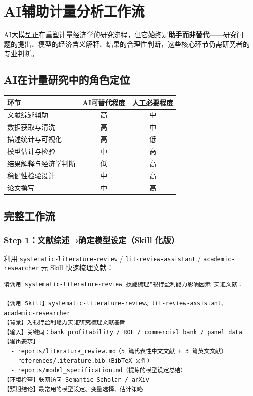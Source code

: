 \section{AI辅助计量分析工作流}

AI大模型正在重塑计量经济学的研究流程，但它始终是\textbf{助手而非替代}——研究问题的提出、模型的经济含义解释、结果的合理性判断，这些核心环节仍需研究者的专业判断。

\subsection{AI在计量研究中的角色定位}

\begin{table}[H]
\centering
\begin{tabular}{lcc}
\toprule
\textbf{环节} & \textbf{AI可替代程度} & \textbf{人工必要程度} \\
\midrule
文献综述辅助 & 高 & 中 \\
数据获取与清洗 & 高 & 中 \\
描述统计与可视化 & 高 & 低 \\
模型估计与检验 & 中 & 高 \\
结果解释与经济学判断 & 低 & 高 \\
稳健性检验设计 & 中 & 高 \\
论文撰写 & 中 & 高 \\
\bottomrule
\end{tabular}
\end{table}

\subsection{完整工作流}

\subsubsection{Step 1：文献综述→确定模型设定（Skill 化版）}

利用 \texttt{systematic-literature-review} / \texttt{lit-review-assistant} / \texttt{academic-researcher} 元 Skill 快速梳理文献：

\begin{lstlisting}
请调用 systematic-literature-review 技能梳理"银行盈利能力影响因素"实证文献：

【调用 Skill】systematic-literature-review、lit-review-assistant、academic-researcher
【背景】为银行盈利能力实证研究梳理文献基础
【输入】关键词：bank profitability / ROE / commercial bank / panel data
【输出要求】
  - reports/literature_review.md（5 篇代表性中文文献 + 3 篇英文文献）
  - references/literature.bib（BibTeX 文件）
  - reports/model_specification.md（提炼的模型设定总结）
【环境检查】联网访问 Semantic Scholar / arXiv
【预期结论】最常用的模型设定、变量选择、估计策略
\end{lstlisting}


